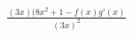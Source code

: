\documentclass[preview]{standalone}
\begin{document}
\begin{align*}
\frac{(3x)(8x^2+1-f(x)g'(x)}{(3x)^2}
\end{align*}
\end{document}

